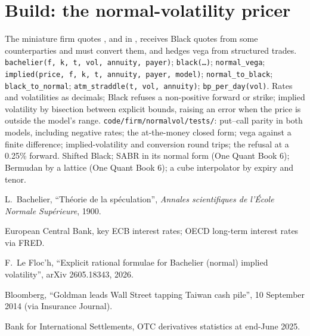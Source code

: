 \section{Build: the normal-volatility pricer}\label{bld:m2:the-rates-options-market:normalvol}

\begin{build}
 The miniature firm quotes ,  and  in , receives Black quotes from some counterparties and must convert
them, and hedges vega from structured trades.
 \texttt{bachelier(f, k, t, vol, annuity, payer)};
\texttt{black(\ldots)}; \texttt{normal\_vega}; \texttt{implied(price, f, k, t,
annuity, payer, model)}; \texttt{normal\_to\_black};
\texttt{black\_to\_normal}; \texttt{atm\_straddle(t, vol, annuity)};
\texttt{bp\_per\_day(vol)}.
 Rates and volatilities as decimals; Black refuses a non-positive
forward or strike; implied volatility by bisection between explicit bounds,
raising an error when the price is outside the model's range.
 \texttt{code/firm/normalvol/tests/}: put--call parity in
both models, including negative rates; the at-the-money closed form; vega
against a finite difference; implied-volatility and conversion round trips;
the refusal at a 0.25\% forward.
 Shifted Black; SABR in its normal form (One Quant Book 6);
Bermudan  by a lattice (One Quant Book 6); a cube interpolator by
expiry and tenor.
\end{build}

\begin{omsources}
\item L.~Bachelier, ``Th\'eorie de la sp\'eculation'', \emph{Annales
scientifiques de l'\'Ecole Normale Sup\'erieure}, 1900.
\item European Central Bank, key ECB interest rates; OECD long-term interest
rates via FRED.
\item F.~Le Floc'h, ``Explicit rational formulae for Bachelier (normal) implied
volatility'', arXiv 2605.18343, 2026.
\item Bloomberg, ``Goldman leads Wall Street tapping Taiwan cash pile'', 10
September 2014 (via Insurance Journal).
\item Bank for International Settlements, OTC derivatives statistics at
end-June 2025.
\end{omsources}

